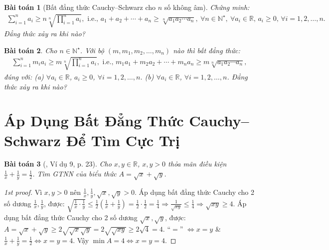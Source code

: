 \documentclass{article}
\newtheorem{baitoan}{Bài toán}
\begin{document}
\begin{baitoan}[Bất đẳng thức Cauchy--Schwarz cho $n$ số không âm]
	Chứng minh:
	\begin{align*}
		\sum_{i=1}^n a_i\ge n\sqrt[n]{\prod_{i=1}^n a_i},\mbox{ i.e., } a_1 + a_2 + \cdots + a_n\ge\sqrt[n]{a_1a_2\cdots a_n},\ \forall n\in\mathbb{N}^\star,\ \forall a_i\in\mathbb{R},\,a_i\ge0,\,\forall i = 1,2,\ldots,n.
	\end{align*}
	Đẳng thức xảy ra khi nào?
\end{baitoan}

\begin{baitoan}
	Cho $n\in\mathbb{N}^\star$. Với bộ $(m,m_1,m_2,\ldots,m_n)$ nào thì bất đẳng thức:
	\begin{align*}
		\sum_{i=1}^n m_ia_i\ge m\sqrt[n]{\prod_{i=1}^n a_i},\mbox{ i.e., } m_1a_1 + m_2a_2 + \cdots + m_na_n\ge m\sqrt[n]{a_1a_2\cdots a_n},
	\end{align*}
	đúng với: (a) $\forall a_i\in\mathbb{R}$, $a_i\ge0$, $\forall i = 1,2,\ldots,n$. (b) $\forall a_i\in\mathbb{R}$, $\forall i = 1,2,\ldots,n$.
	Đẳng thức xảy ra khi nào?
\end{baitoan}



\section{Áp Dụng Bất Đẳng Thức Cauchy--Schwarz Để Tìm Cực Trị}

\begin{baitoan}[\cite{Tuyen_Toan_9}, Ví dụ 9, p. 23]
	Cho $x,y\in\mathbb{R}$, $x,y > 0$ thỏa mãn điều kiện $\frac{1}{x} + \frac{1}{y} = \frac{1}{2}$. Tìm {\rm GTNN} của biểu thức $A = \sqrt{x} + \sqrt{y}$.
\end{baitoan}

\begin{proof}[1st proof]
	Vì $x,y > 0$ nên $\frac{1}{x},\frac{1}{y},\sqrt{x},\sqrt{y} > 0$. Áp dụng bất đẳng thức Cauchy cho 2 số dương $\frac{1}{x},\frac{1}{y}$, được: $\sqrt{\frac{1}{x}\cdot\frac{1}{y}}\le\frac{1}{2}\left(\frac{1}{x} + \frac{1}{y}\right) = \frac{1}{2}\cdot\frac{1}{2} = \frac{1}{4}\Rightarrow\frac{1}{\sqrt{xy}}\le\frac{1}{4}\Rightarrow\sqrt{xy}\ge4$. Áp dụng bất đẳng thức Cauchy cho 2 số dương $\sqrt{x},\sqrt{y}$, được: $A = \sqrt{x} + \sqrt{y}\ge2\sqrt{\sqrt{x}\sqrt{y}} = 2\sqrt{\sqrt{xy}}\ge2\sqrt{4} = 4$. ``$=$'' $\Leftrightarrow x = y$ \& $\frac{1}{x} + \frac{1}{y} = \frac{1}{2}\Leftrightarrow x = y = 4$. Vậy $\min A = 4\Leftrightarrow x = y = 4$.
\end{proof}
\end{document}
